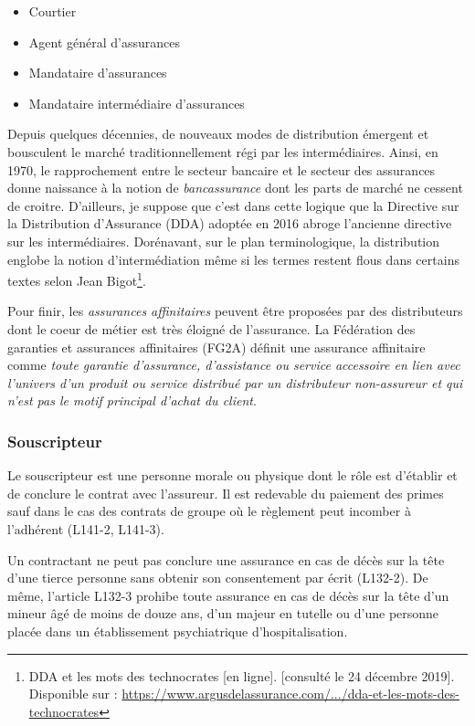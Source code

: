 \documentclass{article}
\newcommand{\blackFrame}[2]{
    \begin{tcolorbox}[colback=white,colframe=black!100!white,title={#1}]
        #2
    \end{tcolorbox}
}
\begin{document}
\begin{itemize}
    \item Courtier
    \item Agent général d'assurances
    \item Mandataire d'assurances
    \item Mandataire intermédiaire d'assurances
\end{itemize}

Depuis quelques décennies, de nouveaux modes de distribution émergent et bousculent le marché traditionnellement régi par les intermédiaires. Ainsi, en 1970, le rapprochement entre le secteur bancaire et le secteur des assurances donne naissance à la notion de \textit{bancassurance} dont les parts de marché ne cessent de croitre. D'ailleurs, je suppose que c'est dans cette logique que la Directive sur la Distribution d'Assurance (DDA) adoptée en 2016 abroge l'ancienne directive sur les intermédiaires. Dorénavant, sur le plan terminologique, la distribution englobe la notion d'intermédiation même si les termes restent flous dans certains textes selon Jean Bigot\footnote{DDA et les mots des technocrates
[en ligne]. [consulté le 24 décembre 2019]. Disponible sur : \href{https://www.argusdelassurance.com/juriscope/decryptages/dda-et-les-mots-des-technocrates.145990}{https://www.argusdelassurance.com/.../dda-et-les-mots-des-technocrates}}.

Pour finir, les \textit{assurances affinitaires} peuvent être proposées par des distributeurs dont le coeur de métier est très éloigné de l'assurance. La Fédération des garanties et assurances affinitaires (FG2A) définit une assurance affinitaire comme \textit{toute garantie d'assurance, d'assistance ou service accessoire en lien avec l'univers d'un produit ou service distribué par un distributeur non-assureur et qui n'est pas le motif principal d'achat du client}.

\subsubsection{Souscripteur}
Le souscripteur est une personne morale ou physique dont le rôle est d'établir et de conclure le contrat avec l'assureur. Il est redevable du paiement des primes sauf dans le cas des contrats de groupe où le règlement peut incomber à l'adhérent (L141-2, L141-3).

\blackFrame{Votum mortis}{
    Un contractant ne peut pas conclure une assurance en cas de décès sur la tête d'une tierce personne sans obtenir son consentement par écrit (L132-2). De même, l'article L132-3 prohibe toute assurance en cas de décès sur la tête d'un mineur âgé de moins de douze ans, d'un majeur en tutelle ou d'une personne placée dans un établissement psychiatrique d'hospitalisation.
}
\end{document}
